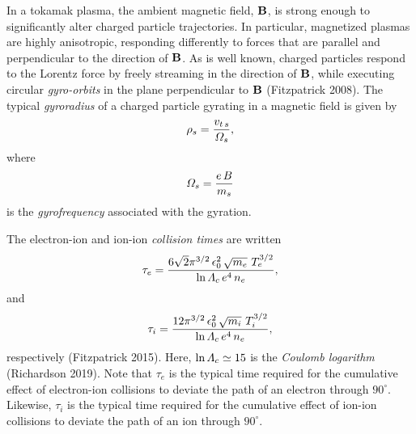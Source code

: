 \documentclass[notitlepage,12pt]{article}
\begin{document}
In a tokamak plasma,  the ambient magnetic field, 
${\bf B}$,  is strong enough to significantly alter charged particle
trajectories. In particular,
magnetized plasmas are highly  anisotropic, responding differently to
forces that are parallel and perpendicular to the direction
of ${\bf B}$. As is well known, charged particles respond to the Lorentz force
by freely streaming in the direction of ${\bf B}$, while executing
circular  {\em gyro-orbits} in the plane perpendicular to ${\bf B}$ (Fitzpatrick 2008). 
The typical   {\em gyroradius}\/ of a charged particle 
gyrating in a
magnetic field is given by
\begin{equation}
\rho_s = \frac{v_{t\,s}}{{\mit\Omega}_s},
\end{equation}
where
\begin{equation}
{\mit\Omega}_s = \frac{e\,B}{m_s}
\end{equation}
is the  {\em gyrofrequency}\/ associated with the
gyration. 

The electron-ion and ion-ion {\em collision times}\/ are
written
\begin{equation}\label{e3.74}
\tau_e = \frac{6\sqrt{2}\pi^{3/2}\,\epsilon_0^{2}\,\sqrt{m_e}\,\,T_e^{3/2}}
{\ln{\mit\Lambda}_c\, e^4\, n_e},
\end{equation}
and
\begin{equation}\label{e3.75}
\tau_i = \frac{ 12\pi^{3/2}\,\epsilon_0^{2}\,\sqrt{m_i}\,\,T_i^{3/2}}
{\ln{\mit\Lambda}_c\, e^4\, n_e},
\end{equation}
respectively (Fitzpatrick 2015). 
Here, $\ln{\mit\Lambda}_c\simeq 15$ is 
the  {\em Coulomb logarithm}\/ (Richardson 2019). Note that $\tau_e$ is the typical time required for the cumulative effect of electron-ion collisions to
deviate the path of an electron through $90^\circ$. Likewise, $\tau_i$ is the typical time required for the cumulative effect of ion-ion collisions to
deviate the path of an ion through $90^\circ$. 
\end{document}
